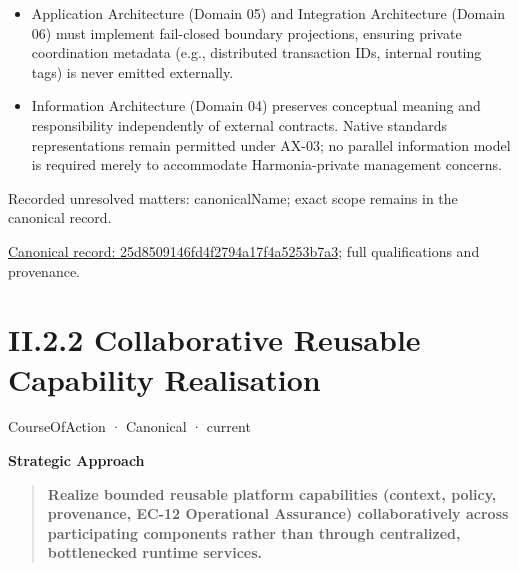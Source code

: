 \begin{itemize}


\item Application Architecture (Domain 05) and Integration Architecture (Domain 06) must implement fail-closed boundary projections, ensuring private coordination metadata (e.g., distributed transaction IDs, internal routing tags) is never emitted externally.

\item Information Architecture (Domain 04) preserves conceptual meaning and responsibility independently of external contracts. Native standards representations remain permitted under AX-03; no parallel information model is required merely to accommodate Harmonia-private management concerns.

\end{itemize}

{\small Recorded unresolved matters: canonicalName; exact scope remains in the canonical record.}\par
{\footnotesize \href{../../../../continuum/strategy/course-of-action/25d8509146fd4f2794a17f4a5253b7a3.md}{Canonical record: 25d8509146fd4f2794a17f4a5253b7a3}; full qualifications and provenance.}\par
\section*{II.2.2 Collaborative Reusable Capability Realisation}
\label{navigation:II.2.2}

\label{element:503939e1fa464b78b1d980ddedfeb3cf}
{\small CourseOfAction · Canonical · current}\par

\par\medskip\textbf{Strategic Approach}\par


\begin{quote}


\textbf{Realize bounded reusable platform capabilities (context, policy, provenance, EC-12 Operational Assurance) collaboratively across participating components rather than through centralized, bottlenecked runtime services.}



\end{quote}


